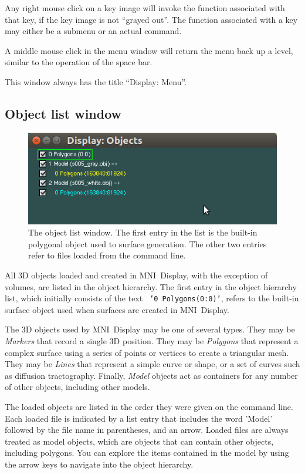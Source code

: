 \documentclass[11pt,letterpaper]{article}
\newcommand{\display}{\mbox{MNI Display}}
\begin{document}
Any right mouse click on a key image will invoke the function
associated with that key, if the key image is not ``grayed out''. The
function associated with a key may either be a submenu or an actual
command.

A middle mouse click in the menu window will return the menu back up a
level, similar to the operation of the space bar.

This window always has the title ``Display: Menu''.

\subsection{Object list window}

\begin{figure}
\centering
\includegraphics[width=0.9\linewidth]{display-obj-list.png}
\caption{The object list window. The first entry in the list is the built-in polygonal object used to surface generation. The other two entries refer to files loaded from the command line.}
\label{winObjList}
\end{figure}

All 3D objects loaded and created in \display{}, with the exception of
volumes, are listed in the object hierarchy. The first entry in the
object hierarchy list, which initially consists of the text {\tt
  '0 Polygons(0:0)'}, refers to the built-in surface object used when
surfaces are created in \display{}.

The 3D objects used by \display{} may be one of several types. They
may be {\em Markers} that record a single 3D position. They may be
{\em Polygons} that represent a complex surface using a series of
points or vertices to create a triangular mesh. They may be {\em
  Lines} that represent a simple curve or shape, or a set of curves
such as diffusion tractography. Finally, {\em Model} objects act as
containers for any number of other objects, including other models.

The loaded objects are listed in the order they were given on the
command line. Each loaded file is indicated by a list entry that
includes the word 'Model' followed by the file name in parentheses, and
an arrow.  Loaded files are always treated as model objects, which are
objects that can contain other objects, including polygons. You can
explore the items contained in the model by using the arrow keys to
navigate into the object hierarchy.
\end{document}
